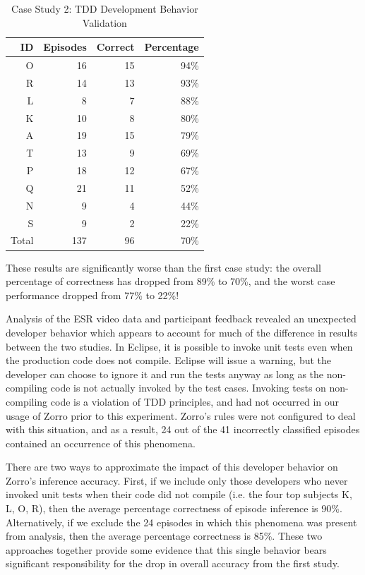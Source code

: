 \documentclass[smallextended]{svjour3}     %
\begin{document}
\begin{table}[ht]
\centering
  \caption{Case Study 2: TDD Development Behavior Validation}
  \begin{tabular}{|r|r|r|r|}
  \hline
    ID & Episodes  & Correct & Percentage \\ \hline
    O       & 16   &  15   & 94\% \\ \hline
    R       & 14   &  13   & 93\% \\ \hline
    L       &  8   &   7   & 88\% \\ \hline  
    K       & 10   &   8   & 80\% \\ \hline
    A       & 19   &  15   & 79\% \\ \hline  
    T       & 13   &   9   & 69\% \\ \hline
    P       & 18   &  12   & 67\% \\ \hline
    Q       & 21   &  11   & 52\% \\ \hline
    N       &  9   &   4   & 44\% \\ \hline
    S       &  9   &   2   & 22\% \\ \hline
    Total   & 137  &  96   & 70\% \\ \hline
    \end{tabular}
  \label{tab:EpisodeBehaviorAgreed} 
\end{table}

These results are significantly worse than the first case study: the
overall percentage of correctness has dropped from 89\% to 70\%, and the
worst case performance dropped from 77\% to 22\%!

Analysis of the ESR video data and participant feedback revealed an
unexpected developer behavior which appears to account for much of the
difference in results between the two studies.  In Eclipse, it is possible
to invoke unit tests even when the production code does not
compile. Eclipse will issue a warning, but the developer can choose to
ignore it and run the tests anyway as long as the non-compiling code is not
actually invoked by the test cases.  Invoking tests on non-compiling
code is a violation of TDD principles, and had not occurred in our usage
of Zorro prior to this experiment. Zorro's rules were not configured to
deal with this situation, and as a result, 24 out of the 41 incorrectly
classified episodes contained an occurrence of this phenomena.

There are two ways to approximate the impact of this developer behavior on
Zorro's inference accuracy.  First, if we include only those developers who
never invoked unit tests when their code did not compile (i.e. the four top
subjects K, L, O, R), then the average percentage correctness of episode
inference is 90\%. Alternatively, if we exclude the 24 episodes in which
this phenomena was present from analysis, then the average percentage
correctness is 85\%.  These two approaches together provide some evidence that this
single behavior bears significant responsibility for the drop in overall accuracy
from the first study.
\end{document}
